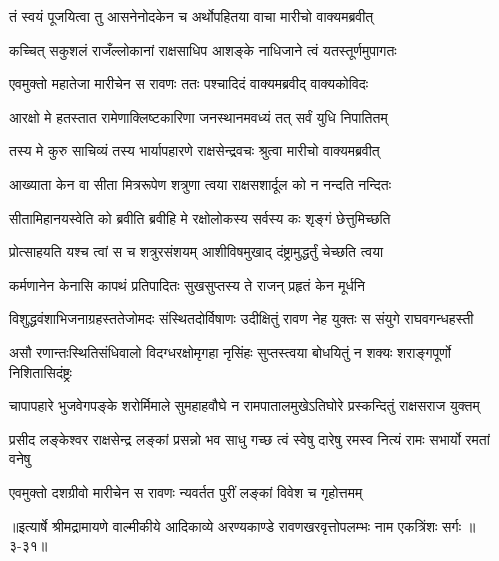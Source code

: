 \twolineshloka
{तं स्वयं पूजयित्वा तु आसनेनोदकेन च}
{अर्थोपहितया वाचा मारीचो वाक्यमब्रवीत्} %

\twolineshloka
{कच्चित् सकुशलं राजँल्लोकानां राक्षसाधिप}
{आशङ्के नाधिजाने त्वं यतस्तूर्णमुपागतः} %

\twolineshloka
{एवमुक्तो महातेजा मारीचेन स रावणः}
{ततः पश्चादिदं वाक्यमब्रवीद् वाक्यकोविदः} %

\twolineshloka
{आरक्षो मे हतस्तात रामेणाक्लिष्टकारिणा}
{जनस्थानमवध्यं तत् सर्वं युधि निपातितम्} %

\twolineshloka
{तस्य मे कुरु साचिव्यं तस्य भार्यापहारणे}
{राक्षसेन्द्रवचः श्रुत्वा मारीचो वाक्यमब्रवीत्} %

\twolineshloka
{आख्याता केन वा सीता मित्ररूपेण शत्रुणा}
{त्वया राक्षसशार्दूल को न नन्दति नन्दितः} %

\twolineshloka
{सीतामिहानयस्वेति को ब्रवीति ब्रवीहि मे}
{रक्षोलोकस्य सर्वस्य कः शृङ्गं छेत्तुमिच्छति} %

\twolineshloka
{प्रोत्साहयति यश्च त्वां स च शत्रुरसंशयम्}
{आशीविषमुखाद् दंष्ट्रामुद्धर्तुं चेच्छति त्वया} %

\twolineshloka
{कर्मणानेन केनासि कापथं प्रतिपादितः}
{सुखसुप्तस्य ते राजन् प्रहृतं केन मूर्धनि} %

\twolineshloka
{विशुद्धवंशाभिजनाग्रहस्ततेजोमदः संस्थितदोर्विषाणः}
{उदीक्षितुं रावण नेह युक्तः स संयुगे राघवगन्धहस्ती} %

\twolineshloka
{असौ रणान्तःस्थितिसंधिवालो विदग्धरक्षोमृगहा नृसिंहः}
{सुप्तस्त्वया बोधयितुं न शक्यः शराङ्गपूर्णो निशितासिदंष्ट्रः} %

\twolineshloka
{चापापहारे भुजवेगपङ्के शरोर्मिमाले सुमहाहवौघे}
{न रामपातालमुखेऽतिघोरे प्रस्कन्दितुं राक्षसराज युक्तम्} %

\twolineshloka
{प्रसीद लङ्केश्वर राक्षसेन्द्र लङ्कां प्रसन्नो भव साधु गच्छ}
{त्वं स्वेषु दारेषु रमस्व नित्यं रामः सभार्यो रमतां वनेषु} %

\twolineshloka
{एवमुक्तो दशग्रीवो मारीचेन स रावणः}
{न्यवर्तत पुरीं लङ्कां विवेश च गृहोत्तमम्} %


॥इत्यार्षे श्रीमद्रामायणे वाल्मीकीये आदिकाव्ये अरण्यकाण्डे रावणखरवृत्तोपलम्भः नाम एकत्रिंशः सर्गः ॥३-३१॥
